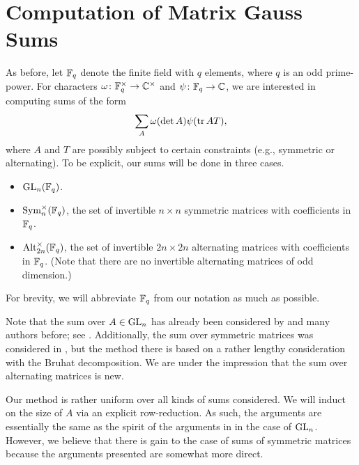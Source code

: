 
\section{Computation of Matrix Gauss Sums} \label{sec:gsum}
As before, let $\mathbb F_q$ denote the finite field with $q$ elements, where $q$ is an odd prime-power. For characters $\omega\colon\mathbb F_q^\times\to\mathbb C^\times$ and $\psi\colon\mathbb F_q\to\mathbb C$, we are interested in computing sums of the form
\[\sum_A\omega(\det A)\psi(\operatorname{tr} AT),\]
where $A$ and $T$ are possibly subject to certain constraints (e.g., symmetric or alternating). To be explicit, our sums will be done in three cases.
\begin{itemize}
    \item $\mathrm{GL}_n(\mathbb F_q)$.
    \item $\operatorname{Sym}_n^\times(\mathbb F_q)$, the set of invertible $n\times n$ symmetric matrices with coefficients in $\mathbb F_q$.
    \item $\operatorname{Alt}_{2n}^\times(\mathbb F_q)$, the set of invertible $2n\times 2n$ alternating matrices with coefficients in $\mathbb F_q$. (Note that there are no invertible alternating matrices of odd dimension.)
\end{itemize}
For brevity, we will abbreviate $\mathbb F_q$ from our notation as much as possible.

Note that the sum over $A\in\mathrm{GL}_n$ has already been considered by \cite{kim-gauss-sum} and many authors before; see \cite[Section 1]{kim-gauss-sum}. Additionally, the sum over symmetric matrices was considered in \cite{saito-sym-gauss-sum}, but the method there is based on a rather lengthy consideration with the Bruhat decomposition. We are under the impression that the sum over alternating matrices is new.

Our method is rather uniform over all kinds of sums considered. We will induct on the size of $A$ via an explicit row-reduction. As such, the arguments are essentially the same as the spirit of the arguments in \cite{kim-gauss-sum} in the case of $\mathrm{GL}_n$. However, we believe that there is gain to the case of sums of symmetric matrices because the arguments presented are somewhat more direct.

